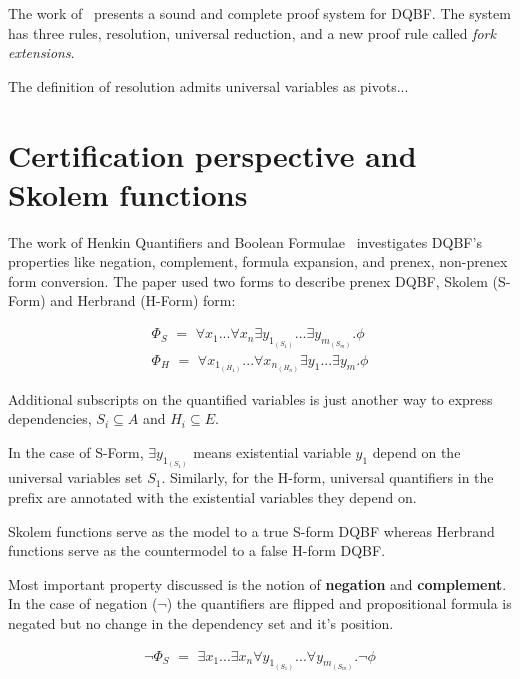 \documentclass[runningheads]{llncs}
\begin{document}
The work of~\cite{rabe2017resolution} presents a sound and complete proof system for DQBF.
%
The system has three rules, resolution, universal reduction, and a new proof rule called \textit{fork extensions}.

The definition of resolution admits universal variables as pivots...

\section{Certification perspective and Skolem functions}

The work of Henkin Quantifiers and Boolean Formulae~\cite{balabanov2012henkin} investigates DQBF's properties like negation, complement, formula expansion, and prenex, non-prenex form conversion. 
%
The paper used two forms to describe prenex DQBF, Skolem (S-Form) and Herbrand (H-Form) form:

\begin{align}
\Phi_{S} \,\, = \,\, \forall x_{1}... \forall x_{n} \exists y_{1_{(S_{1})}}...\exists y_{m_{(S_{m})}} . \phi \label{eq1}\\
\Phi_{H}  \,\, = \,\, \forall x_{1_{(H_{1})}}... \forall x_{n_{(H_{n})}} \exists y_{1}...\exists y_{m} . \phi \label{eq2}
\end{align}

Additional subscripts on the quantified variables is just another way to express dependencies, $S_{i} \subseteq A$ and $H_{i} \subseteq E$.

In the case of S-Form, $\exists y_{1_{(S_{1})}}$ means  existential variable $y_{1}$ depend on the universal variables set $S_{1}$. 
%
Similarly, for the H-form, universal quantifiers in the prefix are annotated with the existential variables they depend on. 

Skolem functions serve as the model to a true S-form DQBF whereas Herbrand functions serve as the countermodel to a false H-form DQBF.

Most important property discussed is the notion of \textbf{negation} and \textbf{complement}.
%
In the case of negation ($\neg$) the quantifiers are flipped and propositional formula is negated but no change in the dependency set and it's position.

\begin{align}
\neg \Phi_{S} \,\, =   \,\, \exists x_{1}... \exists x_{n} \forall y_{1_{(S_{1})}}...\forall y_{m_{(S_{m})}} . \neg \phi \label{eq3}
\end{align}
\end{document}
